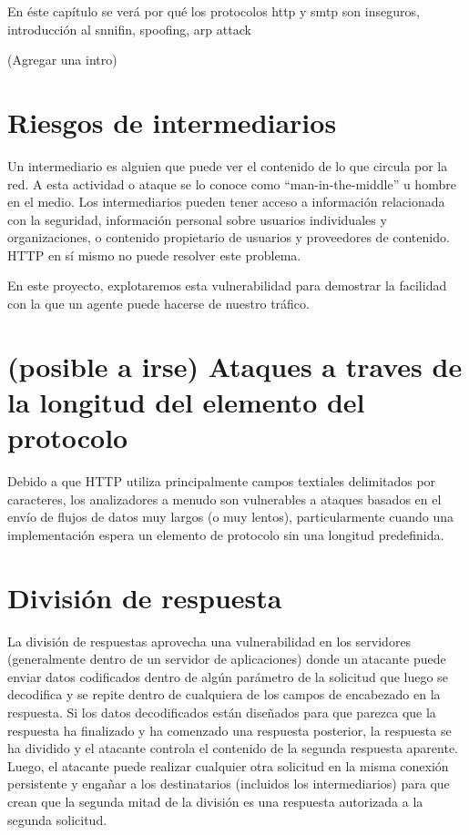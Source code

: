 
En éste capítulo se verá por qué los protocolos http y smtp son inseguros, introducción al snnifin, spoofing, arp attack

(Agregar una intro)


\section{Riesgos de intermediarios}

Un intermediario es alguien que puede ver el contenido de lo que circula por 
la red. A esta actividad o ataque se lo conoce como “man-in-the-middle” u 
hombre en el medio. Los intermediarios pueden tener acceso a información 
relacionada con la seguridad, información personal sobre usuarios individuales 
y organizaciones, o contenido propietario de usuarios y proveedores de 
contenido. HTTP en sí mismo no puede resolver este problema.

En este proyecto, explotaremos esta vulnerabilidad para demostrar la facilidad
 con la que un agente puede hacerse de nuestro tráfico.


\section{(posible a irse) Ataques a traves de la longitud del elemento del protocolo}

Debido a que HTTP utiliza principalmente campos textiales delimitados por caracteres,
los analizadores a menudo son vulnerables a ataques basados en el envío de 
flujos de datos muy largos (o muy lentos), particularmente cuando una 
implementación espera un elemento de protocolo sin una longitud predefinida.


\section{División de respuesta}


La división de respuestas aprovecha una vulnerabilidad en los servidores 
(generalmente dentro de un servidor de aplicaciones) donde un atacante 
puede enviar datos codificados dentro de algún parámetro de la solicitud 
que luego se decodifica y se repite dentro de cualquiera de los campos de 
encabezado en la respuesta. Si los datos decodificados están diseñados para 
que parezca que la respuesta ha finalizado y ha comenzado una respuesta 
posterior, la respuesta se ha dividido y el atacante controla el contenido 
de la segunda respuesta aparente. Luego, el atacante puede realizar 
cualquier otra solicitud en la misma conexión persistente y engañar a los 
destinatarios (incluidos los intermediarios) para que crean que la segunda 
mitad de la división es una respuesta autorizada a la segunda solicitud.



